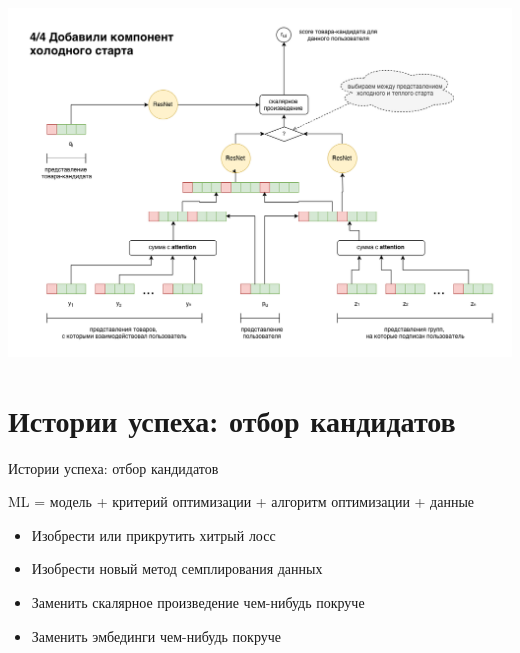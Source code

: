 \documentclass[11pt,aspectratio=169]{beamer}
\begin{document}
\begin{frame}

\begin{center}
\includegraphics[scale=0.3]{images/svdpp-export.png}
\end{center}

\end{frame}

\section{Истории успеха: отбор кандидатов}

\begin{frame}{Истории успеха: отбор кандидатов}

ML = модель + критерий оптимизации + алгоритм оптимизации + данные

\vfill

\begin{tcolorbox}[colback=info!5,colframe=info!80,title=Как оставить след в науке]
\pause
\begin{itemize}
\item Изобрести или прикрутить хитрый лосс \pause
\item Изобрести новый метод семплирования данных \pause
\item Заменить скалярное произведение чем-нибудь покруче \pause
\item Заменить эмбединги чем-нибудь покруче
\end{itemize}
\end{tcolorbox}

\end{frame}
\end{document}
